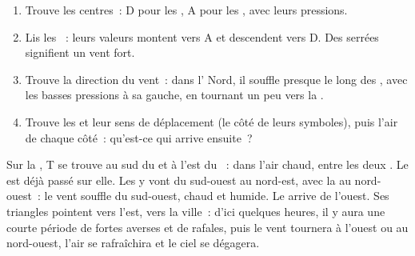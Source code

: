 \begin{method}
\begin{enumerate}
  \item Trouve les centres~: D pour les , A pour les
        , avec leurs pressions.
  \item Lis les ~: leurs valeurs montent vers A et descendent vers
        D. Des  serrées signifient un vent fort.
  \item Trouve la direction du vent~: dans l' Nord, il souffle
        presque le long des , avec les basses pressions à sa
        gauche, en tournant un peu vers la .
  \item Trouve les  et leur sens de déplacement (le côté de leurs
        symboles), puis l'air de chaque côté~: qu'est-ce qui arrive
        ensuite~?
\end{enumerate}
\end{method}

\begin{example}
Sur la , T se trouve au sud du  et à l'est du ~: dans l'air chaud, entre les deux . Le  est déjà
passé sur elle. Les  y vont du sud-ouest au nord-est, avec la
 au nord-ouest~: le vent souffle du sud-ouest, chaud et humide.
Le  arrive de l'ouest. Ses triangles pointent vers l'est, vers
la ville~: d'ici quelques heures, il y aura une courte période de fortes
averses et de rafales, puis le vent tournera à l'ouest ou au nord-ouest,
l'air se rafraîchira et le ciel se dégagera.
\end{example}

